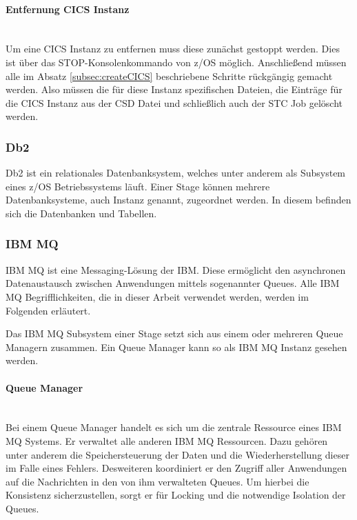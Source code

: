 \paragraph{Entfernung CICS Instanz} ~\\
Um eine CICS Instanz zu entfernen muss diese zunächst gestoppt werden.
Dies ist über das \glqq STOP\grqq-Konsolenkommando von z/OS möglich.
Anschließend müssen alle im Absatz \ref{subsec:createCICS} beschriebene Schritte rückgängig gemacht werden.
Also müssen die für diese Instanz spezifischen Dateien, die Einträge für die CICS Instanz aus der CSD Datei und schließlich auch der STC Job gelöscht werden.

\subsubsection{Db2}\label{sssec:db2}
Db2 ist ein relationales Datenbanksystem, welches unter anderem als Subsystem eines z/OS Betriebssystems läuft.
Einer Stage können mehrere Datenbanksysteme, auch Instanz genannt, zugeordnet werden.
In diesem befinden sich die Datenbanken und Tabellen.

\subsubsection{IBM MQ}\label{sec:mq}
IBM MQ ist eine Messaging-Lösung der IBM.
Diese ermöglicht den asynchronen Datenaustausch zwischen Anwendungen mittels sogenannter Queues.
Alle IBM MQ Begrifflichkeiten, die in dieser Arbeit verwendet werden, werden im Folgenden erläutert.
\cite{Aranha.2013}

Das IBM MQ Subsystem einer Stage setzt sich aus einem oder mehreren Queue Managern zusammen.
Ein Queue Manager kann so als IBM MQ Instanz gesehen werden.

\paragraph{Queue Manager}~\\
Bei einem Queue Manager handelt es sich um die zentrale Ressource eines IBM MQ Systems.
Er verwaltet  alle anderen IBM MQ Ressourcen.
Dazu gehören unter anderem die Speichersteuerung der Daten und die Wiederherstellung dieser im Falle eines Fehlers.
Desweiteren koordiniert er den Zugriff aller Anwendungen auf die Nachrichten in den von ihm verwalteten Queues.
Um hierbei die Konsistenz sicherzustellen, sorgt er für Locking und die notwendige Isolation der Queues.
\cite{Aranha.2013}

